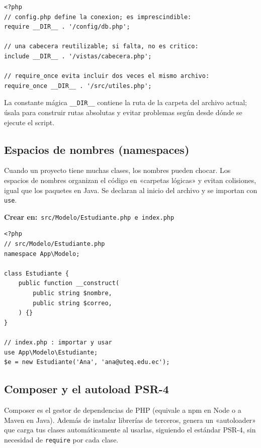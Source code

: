 \documentclass[11pt]{article}
\begin{document}
\begin{cajacodigo}
\begin{lstlisting}[style=php]
<?php
// config.php define la conexion; es imprescindible:
require __DIR__ . '/config/db.php';

// una cabecera reutilizable; si falta, no es critico:
include __DIR__ . '/vistas/cabecera.php';

// require_once evita incluir dos veces el mismo archivo:
require_once __DIR__ . '/src/utiles.php';
\end{lstlisting}
\end{cajacodigo}
\vspace{2pt}
La constante mágica \texttt{\_\_DIR\_\_} contiene la ruta de la carpeta del archivo actual; úsala para construir rutas absolutas y evitar problemas según desde dónde se ejecute el script.

\subsection{Espacios de nombres (namespaces)}
Cuando un proyecto tiene muchas clases, los nombres pueden chocar. Los espacios de nombres organizan el código en «carpetas lógicas» y evitan colisiones, igual que los paquetes en Java. Se declaran al inicio del archivo y se importan con \texttt{use}.

{\small\color{phpazulo}\textbf{Crear en:}~}\texttt{src/\allowbreak{}Modelo/\allowbreak{}Estudiante.\allowbreak{}php  e  index.\allowbreak{}php}\par\nobreak\vspace{-1pt}
\begin{cajacodigo}[Namespaces]
\begin{lstlisting}[style=php]
<?php
// src/Modelo/Estudiante.php
namespace App\Modelo;

class Estudiante {
    public function __construct(
        public string $nombre,
        public string $correo,
    ) {}
}

// index.php : importar y usar
use App\Modelo\Estudiante;
$e = new Estudiante('Ana', 'ana@uteq.edu.ec');
\end{lstlisting}
\end{cajacodigo}
\vspace{2pt}
\subsection{Composer y el autoload PSR-4}
Composer es el gestor de dependencias de PHP (equivale a npm en Node o a Maven en Java). Además de instalar librerías de terceros, genera un «autoloader» que carga tus clases automáticamente al usarlas, siguiendo el estándar PSR-4, sin necesidad de \texttt{require} por cada clase.
\end{document}

